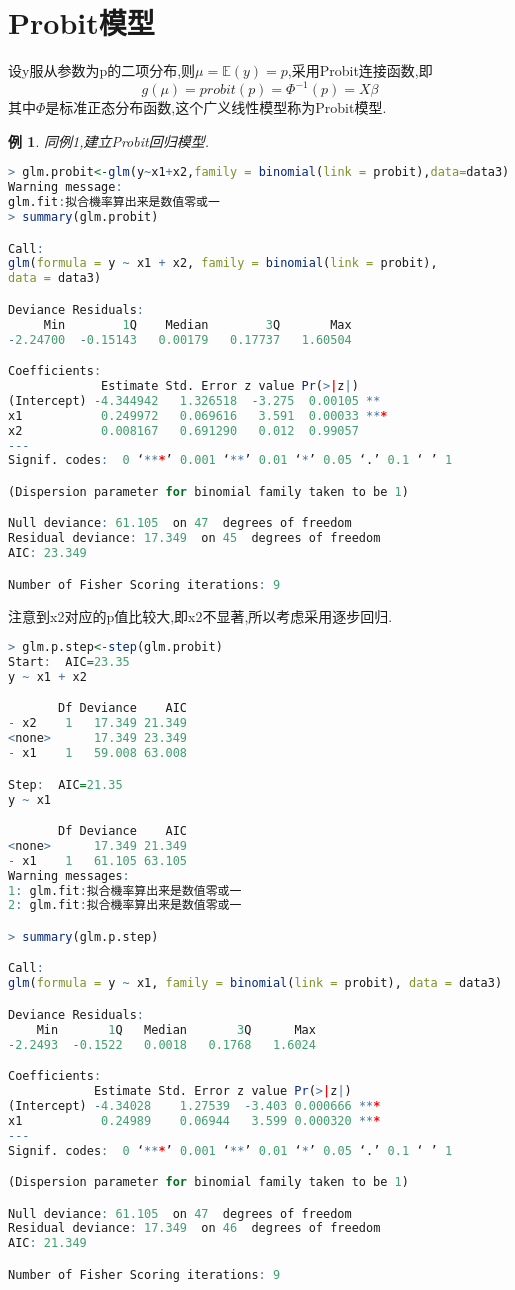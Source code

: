 \documentclass[11pt,a4paper,oneside]{book}
\newtheorem{e}{例}
\begin{document}
\section{Probit模型}
设y服从参数为p的二项分布,则$ \mu=\mathbb{E}(y)=p $,采用Probit连接函数,即\[g(\mu)=probit(p)=\Phi^{-1}(p)=X\beta\]
其中$ \Phi $是标准正态分布函数,这个广义线性模型称为Probit模型.
\begin{e}
同例1,建立Probit回归模型.
\end{e}
\begin{lstlisting}[language=r]
> glm.probit<-glm(y~x1+x2,family = binomial(link = probit),data=data3)
Warning message:
glm.fit:拟合機率算出来是数值零或一 
> summary(glm.probit)

Call:
glm(formula = y ~ x1 + x2, family = binomial(link = probit), 
data = data3)

Deviance Residuals: 
     Min        1Q    Median        3Q       Max  
-2.24700  -0.15143   0.00179   0.17737   1.60504  

Coefficients:
             Estimate Std. Error z value Pr(>|z|)    
(Intercept) -4.344942   1.326518  -3.275  0.00105 ** 
x1           0.249972   0.069616   3.591  0.00033 ***
x2           0.008167   0.691290   0.012  0.99057    
---
Signif. codes:  0 ‘***’ 0.001 ‘**’ 0.01 ‘*’ 0.05 ‘.’ 0.1 ‘ ’ 1

(Dispersion parameter for binomial family taken to be 1)

Null deviance: 61.105  on 47  degrees of freedom
Residual deviance: 17.349  on 45  degrees of freedom
AIC: 23.349

Number of Fisher Scoring iterations: 9
\end{lstlisting}
注意到x2对应的p值比较大,即x2不显著,所以考虑采用逐步回归.
\begin{lstlisting}[language=r]
> glm.p.step<-step(glm.probit)
Start:  AIC=23.35
y ~ x1 + x2

       Df Deviance    AIC
- x2    1   17.349 21.349
<none>      17.349 23.349
- x1    1   59.008 63.008

Step:  AIC=21.35
y ~ x1

       Df Deviance    AIC
<none>      17.349 21.349
- x1    1   61.105 63.105
Warning messages:
1: glm.fit:拟合機率算出来是数值零或一 
2: glm.fit:拟合機率算出来是数值零或一 

> summary(glm.p.step)

Call:
glm(formula = y ~ x1, family = binomial(link = probit), data = data3)

Deviance Residuals: 
    Min       1Q   Median       3Q      Max  
-2.2493  -0.1522   0.0018   0.1768   1.6024  

Coefficients:
            Estimate Std. Error z value Pr(>|z|)    
(Intercept) -4.34028    1.27539  -3.403 0.000666 ***
x1           0.24989    0.06944   3.599 0.000320 ***
---
Signif. codes:  0 ‘***’ 0.001 ‘**’ 0.01 ‘*’ 0.05 ‘.’ 0.1 ‘ ’ 1

(Dispersion parameter for binomial family taken to be 1)

Null deviance: 61.105  on 47  degrees of freedom
Residual deviance: 17.349  on 46  degrees of freedom
AIC: 21.349

Number of Fisher Scoring iterations: 9
\end{lstlisting}
\end{document}

